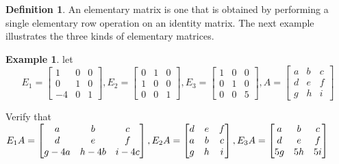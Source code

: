 \documentclass[12pt]{article}
\theoremstyle{definition}
\newtheorem{definition}{Definition} %
\newtheorem{example}{Example}       %
\numberwithin{equation}{theorem}    %
\begin{document}
\begin{definition}
    An elementary matrix is one that is obtained by performing a single elementary row operation on an identity matrix. The next example illustrates the three kinds of elementary matrices.
\end{definition}

\begin{example}
    let $$E_1=\begin{bmatrix}
            1  & 0 & 0 \\
            0  & 1 & 0 \\
            -4 & 0 & 1
        \end{bmatrix},
        E_2=\begin{bmatrix}
            0 & 1 & 0 \\
            1 & 0 & 0 \\
            0 & 0 & 1
        \end{bmatrix},
        E_3=\begin{bmatrix}
            1 & 0 & 0 \\
            0 & 1 & 0 \\
            0 & 0 & 5
        \end{bmatrix},
        A=\begin{bmatrix}
            a & b & c \\
            d & e & f \\
            g & h & i
        \end{bmatrix}$$

    Verify that $E_1A=\begin{bmatrix}
            a    & b    & c    \\
            d    & e    & f    \\
            g-4a & h-4b & i-4c
        \end{bmatrix},
        E_2A=\begin{bmatrix}
            d & e & f \\
            a & b & c \\
            g & h & i
        \end{bmatrix},\\
        E_3A=\begin{bmatrix}
            a  & b  & c  \\
            d  & e  & f  \\
            5g & 5h & 5i
        \end{bmatrix}$
\end{example}
\end{document}
